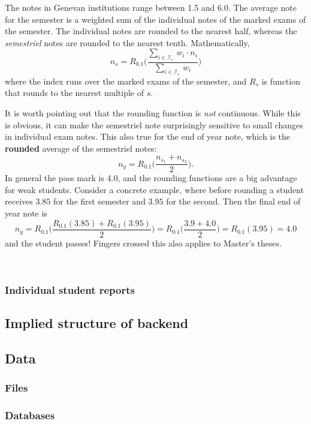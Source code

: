 \documentclass[10pt]{article}
\begin{document}
The notes in Genevan institutions range between 1.5 and 6.0. The average note for the semester is a weighted sum of the individual notes of the marked exams of the semester. The individual notes are rounded to the nearest half, whereas the \emph{semestriel} notes are rounded to the nearest tenth. Mathematically, 
$$ n_s = R_{0.1} \Bigg(\frac{\sum_{i \in \mathcal{I}_s} \, w_i \cdot n_i }{\sum_{i \in \mathcal{I}_s} \, w_i}\Bigg)$$
where the index runs over the marked exams of the semester, and $R_s$ is function that rounds to the nearest multiple of $s$.

It is worth pointing out that the rounding function is \emph{not} continuous. While this is obvious, it can make the semestriel note surprisingly sensitive to small changes in individual exam notes. This also true for the end of year note, which is the \textbf{rounded} average of the semestriel notes:
$$n_y = R_{0.1} \Bigg( \frac{n_{s_1} + n_{s_2}}{2} \Bigg).$$
In general the pass mark is 4.0, and the rounding functions are a big advantage for weak students. Consider a concrete example, where before rounding a student receives $3.85$ for the first semester and $3.95$ for the second. Then the final end of year note is
$$n_y = R_{0.1}  \Bigg( \frac{R_{0.1}(3.85) +R_{0.1}(3.95)}{2} \Bigg) = R_{0.1} \Bigg( \frac{3.9 + 4.0}{2} \Bigg) = R_{0.1}(3.95) = 4.0$$
and the student passes! Fingers crossed this also applies to Master's theses.

\



\subsubsection{Individual student reports} \label{output_report}


\subsection{Implied structure of backend}

\subsection{Data}

\subsubsection{Files}


\subsubsection{Databases}
\end{document}
